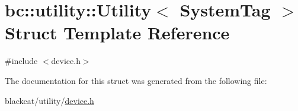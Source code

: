 \hypertarget{structbc_1_1utility_1_1Utility}{}\section{bc\+:\+:utility\+:\+:Utility$<$ System\+Tag $>$ Struct Template Reference}
\label{structbc_1_1utility_1_1Utility}


{\ttfamily \#include $<$device.\+h$>$}



The documentation for this struct was generated from the following file\+:\begin{DoxyCompactItemize}
\item 
blackcat/utility/\hyperlink{utility_2device_8h}{device.\+h}\end{DoxyCompactItemize}
